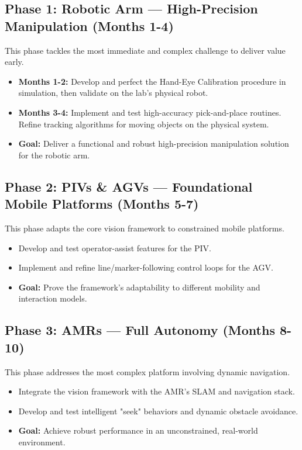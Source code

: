\subsection{Phase 1: Robotic Arm — High-Precision Manipulation (Months 1-4)}
This phase tackles the most immediate and complex challenge to deliver value early.
\begin{itemize}
    \item \textbf{Months 1-2:} Develop and perfect the Hand-Eye Calibration procedure in simulation, then validate on the lab's physical robot.
    \item \textbf{Months 3-4:} Implement and test high-accuracy pick-and-place routines. Refine tracking algorithms for moving objects on the physical system.
    \item \textbf{Goal:} Deliver a functional and robust high-precision manipulation solution for the robotic arm.
\end{itemize}

\subsection{Phase 2: PIVs \& AGVs — Foundational Mobile Platforms (Months 5-7)}
This phase adapts the core vision framework to constrained mobile platforms.
\begin{itemize}
    \item Develop and test operator-assist features for the PIV.
    \item Implement and refine line/marker-following control loops for the AGV.
    \item \textbf{Goal:} Prove the framework's adaptability to different mobility and interaction models.
\end{itemize}

\subsection{Phase 3: AMRs — Full Autonomy (Months 8-10)}
This phase addresses the most complex platform involving dynamic navigation.
\begin{itemize}
    \item Integrate the vision framework with the AMR's SLAM and navigation stack.
    \item Develop and test intelligent "seek" behaviors and dynamic obstacle avoidance.
    \item \textbf{Goal:} Achieve robust performance in an unconstrained, real-world environment.
\end{itemize}

